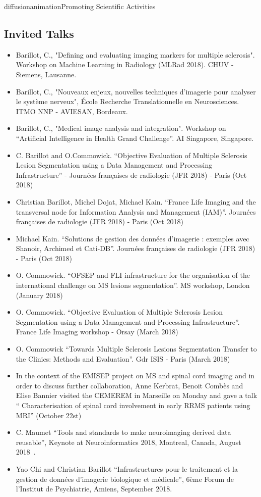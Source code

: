 \documentclass{ra2018}
\begin{document}
\begin{module}{diffusion}{animation}{Promoting Scientific Activities}
\subsection{Invited Talks}
\begin{itemize}
    \item Barillot, C., "Defining and evaluating imaging markers for multiple sclerosis". Workshop on Machine Learning in Radiology (MLRad 2018). CHUV - Siemens, Lausanne.
    \item Barillot, C., "Nouveaux enjeux, nouvelles techniques d'imagerie pour analyser le système nerveux", École Recherche Translationnelle en Neurosciences. ITMO NNP - AVIESAN, Bordeaux.
    \item Barillot, C., "Medical image analysis and integration". Workshop on “Artificial Intelligence in Health Grand Challenge”. AI Singapore, Singapore.      
    \item C. Barillot and O.Commowick. ``Objective Evaluation of Multiple Sclerosis Lesion Segmentation using a Data Management and Processing Infrastructure'' - Journées françaises de radiologie (JFR 2018) - Paris (Oct 2018)~\cite{commowick:inserm-01895603}
    \item Christian Barillot, Michel Dojat, Michael Kain. ``France Life Imaging and the transversal node for Information Analysis and Management (IAM)''. Journées françaises de radiologie (JFR 2018) - Paris (Oct 2018)~\cite{barillot:inserm-01895605}
    \item Michael Kain. ``Solutions de gestion des données d’imagerie : exemples avec Shanoir, Archimed et Cati-DB''. Journées françaises de radiologie (JFR 2018) - Paris (Oct 2018)~\cite{kain:inserm-01895596}
    \item O. Commowick. ``OFSEP and FLI infrastructure for the organisation of the international challenge on MS lesions segmentation''. MS workshop, London (January 2018)
    \item O. Commowick. ``Objective Evaluation of Multiple Sclerosis Lesion Segmentation using a Data Management and Processing Infrastructure''. France Life Imaging workshop - Orsay (March 2018)
    \item O. Commowick ``Towards Multiple Sclerosis Lesions Segmentation Transfer to the Clinics: Methods and Evaluation''. Gdr ISIS - Paris (March 2018)
    \item In the context of the EMISEP project on MS and spinal cord imaging and in order to discuss further collaboration, Anne Kerbrat, Benoit Combès and Elise Bannier visited the CEMEREM in Marseille on Monday and gave a talk `` Characterisation of spinal cord involvement in early RRMS patients using MRI'' (October 22st)
    \item C. Maumet ``Tools and standards to make neuroimaging derived data reusable'', Keynote at Neuroinformatics 2018, Montreal, Canada, August 2018~\cite{maumet:inserm-01886089}.
    \item Yao Chi and Christian Barillot ``Infrastructures pour le traitement et la gestion de données d'imagerie biologique et médicale'', 6ème Forum de l'Institut de Psychiatrie, Amiens, September 2018.
\end{itemize}



\end{module}
\end{document}
